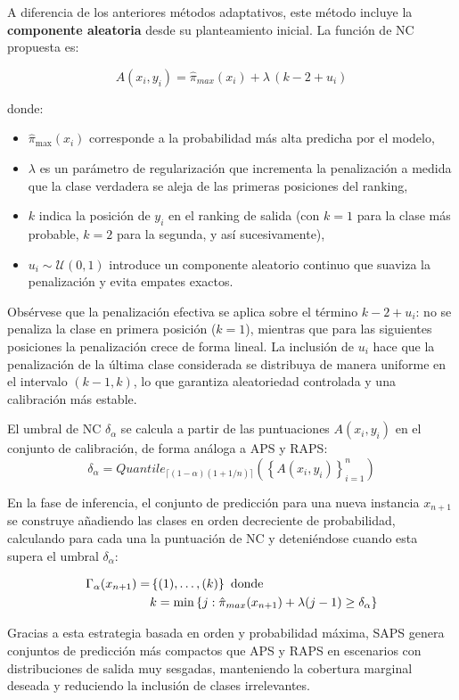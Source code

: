 A diferencia de los anteriores métodos adaptativos, este método incluye la \textbf{componente aleatoria} desde su planteamiento inicial. La función de \acrshort{NC} propuesta es:

$$
A(x_i, y_i) = \hat{\pi}_{max}(x_i) + \lambda \,(k - 2 + u_i)
$$

donde:  
\begin{itemize}
    \item $\hat{\pi}_{\max}(x_i)$ corresponde a la probabilidad más alta predicha por el modelo,  
    \item $\lambda$ es un parámetro de regularización que incrementa la penalización a medida que la clase verdadera se aleja de las primeras posiciones del ranking,  
    \item $k$ indica la posición de $y_i$ en el ranking de salida (con $k=1$ para la clase más probable, $k=2$ para la segunda, y así sucesivamente),  
    \item $u_i \sim \mathcal{U}(0,1)$ introduce un componente aleatorio continuo que suaviza la penalización y evita empates exactos.
\end{itemize}

Obsérvese que la penalización efectiva se aplica sobre el término $k - 2 + u_i$: no se penaliza la clase en primera posición ($k=1$), mientras que para las siguientes posiciones la penalización crece de forma lineal. La inclusión de $u_i$ hace que la penalización de la última clase considerada se distribuya de manera uniforme en el intervalo $(k-1, k)$, lo que garantiza aleatoriedad controlada y una calibración más estable.

El umbral de \acrshort{NC} $\delta_\alpha$ se calcula a partir de las puntuaciones $A(x_i, y_i)$ en el conjunto de calibración, de forma análoga a \acrshort{APS} y \acrshort{RAPS}:
$$
\delta_\alpha = Quantile_{\lceil (1-\alpha)(1+1/n) \rceil} \left( \left\{ A(x_i, y_i) \right\}_{i=1}^n \right)
$$

En la fase de inferencia, el conjunto de predicción para una nueva instancia $x_{n+1}$ se construye añadiendo las clases en orden decreciente de probabilidad, calculando para cada una la puntuación de \acrshort{NC} y deteniéndose cuando esta supera el umbral $\delta_\alpha$:

\begin{align*}
\Gamma_\alpha(x_{n+1}) = &\left\{ (1), \dots, (k) \right\} \ \textnormal{donde} \\
& k = \min \left\{ j : \hat{\pi}_{max}(x_{n+1}) + \lambda (j - 1) \ge \delta_\alpha \right\}
\end{align*}

Gracias a esta estrategia basada en orden y probabilidad máxima, \acrshort{SAPS} genera conjuntos de predicción más compactos que \acrshort{APS} y \acrshort{RAPS} en escenarios con distribuciones de salida muy sesgadas, manteniendo la cobertura marginal deseada y reduciendo la inclusión de clases irrelevantes.




